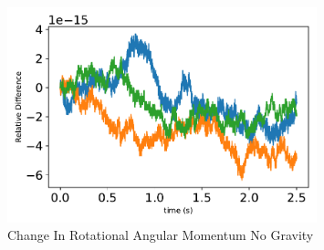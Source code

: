 \begin{figure}[htbp]\centerline{\includegraphics[width=0.8\textwidth]{AutoTeX/ChangeInRotationalAngularMomentumNoGravity}}\caption{Change In Rotational Angular Momentum No Gravity}\label{fig:ChangeInRotationalAngularMomentumNoGravity}\end{figure}